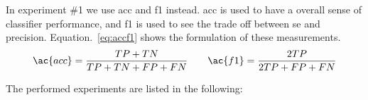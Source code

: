 In experiment \#1 we use \ac{acc} and \ac{f1} instead.
\acl{acc} is used to have a overall sense of classifier performance, and \ac{f1} is used to see the trade off between \ac{se} and precision.
Equation.~\ref{eq:accf1} shows the formulation of these measurements. 
\begin{align}
\ac{acc} = \frac{TP+TN}{TP+TN+FP+FN} \qquad \ac{f1} = \frac{2TP}{2TP +FP+FN}
\label{eq:accf1}
\end{align}

The performed experiments are listed in the following:\\

